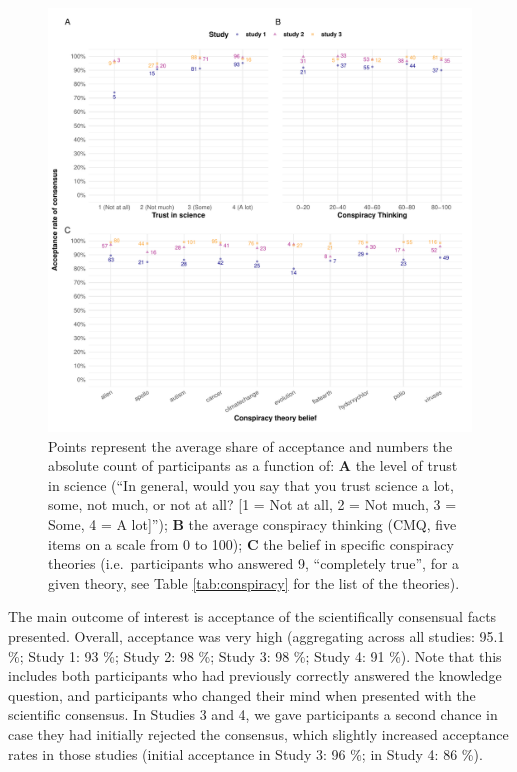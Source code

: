 \documentclass[
  doc,floatsintext]{apa6}
\begin{document}
\begin{figure}
\centering
\includegraphics{output/figures/summary-plot.pdf}
\caption{\label{fig:summary-plot}Points represent the average share of acceptance and numbers the absolute count of participants as a function of: \textbf{A} the level of trust in science (``In general, would you say that you trust science a lot, some, not much, or not at all? {[}1 = Not at all, 2 = Not much, 3 = Some, 4 = A lot{]}''); \textbf{B} the average conspiracy thinking (CMQ, five items on a scale from 0 to 100); \textbf{C} the belief in specific conspiracy theories (i.e.~participants who answered 9, ``completely true'', for a given theory, see Table \ref{tab:conspiracy} for the list of the theories).}
\end{figure}

The main outcome of interest is acceptance of the scientifically consensual facts presented. Overall, acceptance was very high (aggregating across all studies: 95.1 \%; Study 1: 93 \%; Study 2: 98 \%; Study 3: 98 \%; Study 4: 91 \%). Note that this includes both participants who had previously correctly answered the knowledge question, and participants who changed their mind when presented with the scientific consensus. In Studies 3 and 4, we gave participants a second chance in case they had initially rejected the consensus, which slightly increased acceptance rates in those studies (initial acceptance in Study 3: 96 \%; in Study 4: 86 \%).
\end{document}

